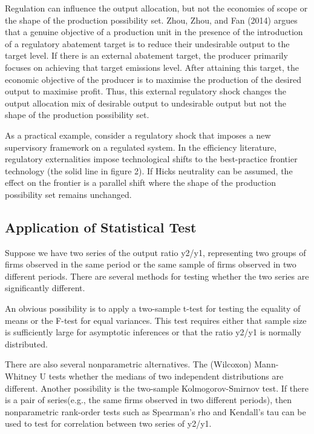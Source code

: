 \documentclass[
  10pt,
]{article}
\begin{document}
Regulation can influence the output allocation, but not the economies of
scope or the shape of the production possibility set. Zhou, Zhou, and
Fan (2014) argues that a genuine objective of a production unit in the
presence of the introduction of a regulatory abatement target is to
reduce their undesirable output to the target level. If there is an
external abatement target, the producer primarily focuses on achieving
that target emissions level. After attaining this target, the economic
objective of the producer is to maximise the production of the desired
output to maximise profit. Thus, this external regulatory shock changes
the output allocation mix of desirable output to undesirable output but
not the shape of the production possibility set.

As a practical example, consider a regulatory shock that imposes a new
supervisory framework on a regulated system. In the efficiency
literature, regulatory externalities impose technological shifts to the
best-practice frontier technology (the solid line in figure 2). If Hicks
neutrality can be assumed, the effect on the frontier is a parallel
shift where the shape of the production possibility set remains
unchanged.

\hypertarget{application-of-statistical-test}{%
\subsection{Application of Statistical
Test}\label{application-of-statistical-test}}

Suppose we have two series of the output ratio y2/y1, representing two
groups of firms observed in the same period or the same sample of firms
observed in two different periods. There are several methods for testing
whether the two series are significantly different.

An obvious possibility is to apply a two-sample t-test for testing the
equality of means or the F-test for equal variances. This test requires
either that sample size is sufficiently large for asymptotic inferences
or that the ratio y2/y1 is normally distributed.

There are also several nonparametric alternatives. The (Wilcoxon)
Mann-Whitney U tests whether the medians of two independent
distributions are different. Another possibility is the two-sample
Kolmogorov-Smirnov test. If there is a pair of series(e.g., the same
firms observed in two different periods), then nonparametric rank-order
tests such as Spearman's rho and Kendall's tau can be used to test for
correlation between two series of y2/y1.
\end{document}
